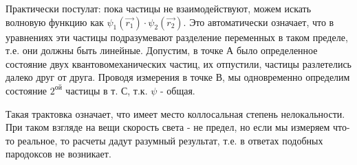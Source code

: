 \par Практически постулат: пока частицы не взаимодействуют, можем искать волновую функцию как $ \psi _1 (\vec{r_1}) \cdot \psi _2 (\vec{r_2})$. Это автоматически означает, что  в уравнениях эти частицы подразумевают разделение переменных в таком пределе, т.е. они должны быть линейные. Допустим, в точке А было определенное состояние двух квантовомеханических частиц, их отпустили, частицы разлетелись далеко друг от друга. Проводя измерения в точке В, мы одновременно определим состояние $2^{ой}$ частицы в т. С, т.к. $\psi$ - общая.
\par Такая трактовка означает, что имеет место коллосальная степень нелокальности. При таком взгляде на вещи скорость света - не предел, но если мы измеряем что-то реальное, то расчеты дадут разумный результат, т.е. в ответах подобных пародоксов не возникает. 